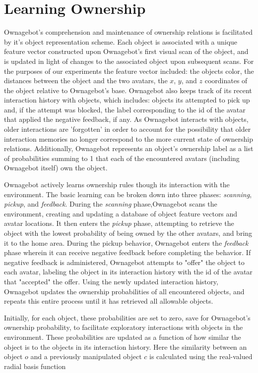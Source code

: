 \documentclass[11pt]{article}
\date{\today}
\title{}
\begin{document}
\tableofcontents

\section{Learning Ownership}
\label{sec:org644daf1}
Ownagebot's comprehension and maintenance of ownership relations is facilitated by it's object representation scheme. Each object is associated with a unique feature vector constructed upon Ownagebot's first visual scan of the object, and is updated in light of changes to the associated object upon subsequent scans. For the purposes of our experiments the feature vector included: the objects color, the distances between the object and the two avatars, the \(x\), \(y\), and \(z\) coordinates of the object relative to Ownagebot's base. Ownagebot also keeps track of its recent interaction history with objects, which includes: objects its attempted to pick up and, if the attempt was blocked, the label corresponding to the id of the avatar that applied the negative feedback, if any. As Ownagebot interacts with objects, older interactions are 'forgotten' in order to account for the possibility that older interaction memories no longer correspond to the more current state of ownership relations. Additionally, Ownagebot represents an object's ownership label as a list of probabilities summing to 1 that each of the encountered avatars (including Ownagebot itself) own the object.

Ownagebot actively learns ownership rules though its interaction with the environment. The basic learning can be broken down into three phases: \emph{scanning}, \emph{pickup}, and \emph{feedback}. During the \emph{scanning} phase,Ownagebot scans the environment, creating and updating a database of object feature vectors and avatar locations. It then enters the \emph{pickup} phase, attempting to retrieve the object with the lowest probability of being owned by the other avatars, and bring it to the home area. During the pickup behavior, Ownagebot enters the \emph{feedback} phase wherein it can receive negative feedback before completing the behavior. If negative feedback is administered, Ownagebot attempts to "offer" the object to each avatar, labeling the object in its interaction history with the id of the avatar that "accepted" the offer. Using the newly updated interaction history, Ownagebot updates the ownership probabilities of all encountered objects, and repeats this entire process until it has retrieved all allowable objects.

Initially, for each object, these probabilities are set to zero, save for Ownagebot's ownership probability, to facilitate exploratory interactions with objects in the environment. These probabilities are updated as a function of how similar the object is to the objects in its interaction history. Here the similarity between an object \(o\) and a previously manipulated object \(c\) is calculated using the real-valued radial basis function
\end{document}

